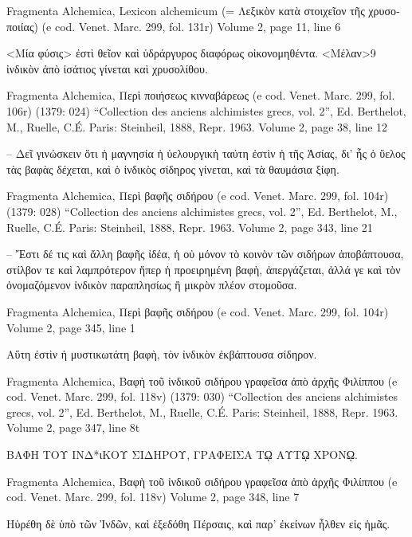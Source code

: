 \documentclass[12pt,letterpaper,twoside,final]{memoir}
\begin{document}
\begin{greek}
Fragmenta Alchemica, Lexicon alchemicum (= Λεξικὸν κατὰ στοιχεῖον τῆς χρυσοποιίας) (e cod. Venet. Marc. 299, fol. 131r) 
Volume 2, page 11, line 6

<Μία φύσις> ἐστὶ θεῖον καὶ ὑδράργυρος διαφόρως οἰκονομηθέντα. 
<Μέλαν>9 ἰνδικὸν ἀπὸ ἰσάτιος γίνεται καὶ χρυσολίθου. 



Fragmenta Alchemica, Περὶ ποιήσεως κινναβάρεως (e cod. Venet. Marc. 299, fol. 106r) (1379: 024)
“Collection des anciens alchimistes grecs, vol. 2”, Ed. Berthelot, M., Ruelle, C.É.
Paris: Steinheil, 1888, Repr. 1963.
Volume 2, page 38, line 12

                               – Δεῖ γινώσκειν ὅτι ἡ μαγνησία 
ἡ ὑελουργικὴ ταύτη ἐστὶν ἡ τῆς Ἀσίας, δι' ἧς ὁ ὕελος τὰς βαφὰς 
δέχεται, καὶ ὁ ἰνδικὸς σίδηρος γίνεται, καὶ τὰ θαυμάσια ξίφη. 



Fragmenta Alchemica, Περὶ βαφῆς σιδήρου (e cod. Venet. Marc. 299, fol. 104r) (1379: 028)
“Collection des anciens alchimistes grecs, vol. 2”, Ed. Berthelot, M., Ruelle, C.É.
Paris: Steinheil, 1888, Repr. 1963.
Volume 2, page 343, line 21

                           – Ἔστι δέ τις καὶ ἄλλη βαφῆς ἰδέα, ἡ οὐ 
μόνον τὸ κοινὸν τῶν σιδήρων ἀποβάπτουσα, στίλβον τε καὶ λαμπρότερον 
ἤπερ ἡ προειρημένη βαφὴ, ἀπεργάζεται, ἀλλά γε καὶ τὸν ὀνομαζόμενον 
ἰνδικὸν παραπλησίως ἢ μικρὸν πλέον στομοῦσα. 



Fragmenta Alchemica, Περὶ βαφῆς σιδήρου (e cod. Venet. Marc. 299, fol. 104r) 
Volume 2, page 345, line 1

                                                                       Αὕτη   
ἐστὶν ἡ μυστικωτάτη βαφὴ, τὸν ἰνδικὸν ἐκβάπτουσα σίδηρον. 



Fragmenta Alchemica, Βαφὴ τοῦ ἰνδικοῦ σιδήρου γραφεῖσα ἀπὸ ἀρχῆς Φιλίππου (e cod. Venet. Marc. 299, fol. 118v) (1379: 030)
“Collection des anciens alchimistes grecs, vol. 2”, Ed. Berthelot, M., Ruelle, C.É.
Paris: Steinheil, 1888, Repr. 1963.
Volume 2, page 347, line 8t

ΒΑΦΗ ΤΟΥ ΙΝΔ*ιΚΟΥ ΣΙΔΗΡΟΥ, ΓΡΑΦΕΙΣΑ 
Τῼ ΑΥΤῼ ΧΡΟΝῼ. 




Fragmenta Alchemica, Βαφὴ τοῦ ἰνδικοῦ σιδήρου γραφεῖσα ἀπὸ ἀρχῆς Φιλίππου (e cod. Venet. Marc. 299, fol. 118v) 
Volume 2, page 348, line 7

                                                           Ηὑρέθη δὲ ὑπὸ τῶν 
Ἰνδῶν, καὶ ἐξεδόθη Πέρσαις, καὶ παρ' ἐκείνων ἦλθεν εἰς ἡμᾶς. 




\end{greek}
\end{document}
